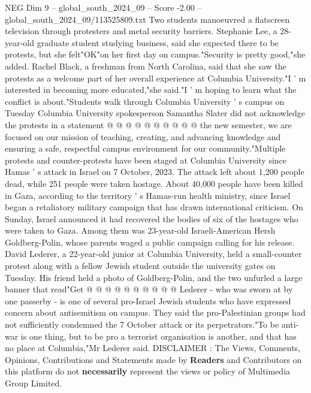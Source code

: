 \begin{textsample}{NEG Dim 9 – global\_south\_2024\_09 – Score -2.00 – global\_south\_2024\_09/113525809.txt}
Two students manoeuvred a flatscreen television through protesters and metal security barriers.
Stephanie Lee, a 28-year-old graduate student studying business, said she expected there to be protests, but she felt"OK"on her first day on campus."Security is pretty good,"she added.
Rachel Black, a freshman from North Carolina, said that she saw the protests as a welcome part of her overall experience at Columbia University."I ' m interested in becoming more educated,"she said."I ' m hoping to learn what the conflict is about."Students walk through Columbia University ' s campus on Tuesday Columbia University spokesperson Samantha Slater did not acknowledge the protests in a statement @ @ @ @ @ @ @ @ @ @ the new semester, we are focused on our mission of teaching, creating, and advancing knowledge and ensuring a safe, respectful campus environment for our community."Multiple protests and counter-protests have been staged at Columbia University since Hamas ' s attack in Israel on 7 October, 2023.
The attack left about 1,200 people dead, while 251 people were taken hostage.
About 40,000 people have been killed in Gaza, according to the territory ' s Hamas-run health ministry, since Israel began a retaliatory military campaign that has drawn international criticism.
On Sunday, Israel announced it had recovered the bodies of six of the hostages who were taken to Gaza.
Among them was 23-year-old Israeli-American Hersh Goldberg-Polin, whose parents waged a public campaign calling for his release.
David Lederer, a 22-year-old junior at Columbia University, held a small-counter protest along with a fellow Jewish student outside the university gates on Tuesday.
His friend held a photo of Goldberg-Polin, and the two unfurled a large banner that read"Get @ @ @ @ @ @ @ @ @ @ Lederer - who was sworn at by one passerby - is one of several pro-Israel Jewish students who have expressed concern about antisemitism on campus.
They said the pro-Palestinian groups had not sufficiently condemned the 7 October attack or its perpetrators."To be anti-war is one thing, but to be pro a terrorist organisation is another, and that has no place at Columbia,"Mr Lederer said.
DISCLAIMER : The Views, Comments, Opinions, Contributions and Statements made by \textbf{Readers} and Contributors on this platform do not \textbf{necessarily} represent the views or policy of Multimedia Group Limited.

\end{textsample}
